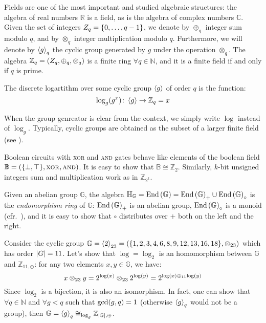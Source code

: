 Fields are one of the most important and studied algebraic structures: the algebra of real numbers 
\(\mathbb{R}\) is a field, as is the algebra of complex numbers \(\mathbb{C}\).
Given the set of integers \(Z_q = \left\{0, \dots, q-1\right\}\), we denote by \(\oplus_q\) integer sum 
modulo \(q\), and by \(\otimes_q\) integer multiplication modulo \(q\).
Furthermore, we will denote by \(\left\langle g\right\rangle_q\) the cyclic group generated by \(g\) under 
the operation \(\otimes_q\).
The algebra \(\mathbb{Z}_q = \left(Z_q, \oplus_q, \otimes_q\right)\) is a finite ring 
\(\forall q \in \mathbb{N}\), and it is a finite field if and only if \(q\) is prime.
\begin{definition}
  The discrete logartithm over some cyclic group \(\left\langle g\right\rangle\) of order \(q\) is the function:
  \[\call{\log_g}{g^x}\colon \gengroup{g} \to \mathbb{Z}_q = x\]
\end{definition}

When the group genreator is clear from the context, we simply write \(\log \) instead of \(\log_g\).
Typically, cyclic groups are obtained as the subset of a larger finite field 
(see ). 
\begin{example}
  Boolean circuits with \textsc{xor} and \textsc{and} gates behave like elements of the boolean 
  field \(\mathbb{B} = \Tuple{\Set{\bot, \top}, \bitxor, \bitand} \).
  It is easy to show that \(\mathbb{B} \cong \mathbb{Z}_2\).
  Similarly, \(k\)-bit unsigned integers sum and multiplication work as in \(\mathbb{Z}_{2^k}\).
\end{example}

\begin{example}
  Given an abelian group \(\mathbb{G}\), the algebra \(\mathbb{H}_{\mathbb{G}} = 
  \mathrm{End}\left(\mathbb{G}\right) = \mathrm{End}\left(\mathbb{G}\right)_{+} \cup \mathrm{End}\left(\mathbb{G}\right)_{\circ}\) 
  is the \emph{endomorphism ring} of \(\mathbb{G}\): \(\mathrm{End}\left(\mathbb{G}\right)_{+}\) is an abelian 
  group, \(\mathrm{End}\left(\mathbb{G}\right)_{\circ}\) is a monoid 
  (cfr.\ ), and it is easy to show that \(\circ \)
  distributes over \(+\) both on the left and the right.
\end{example}

\begin{example}\label{ex:cyclic_group}
  Consider the cyclic group 
  \(\mathbb{G} = \gengroup{2}_{23} = \Tuple{\Set{1, 2, 3, 4, 6, 8, 9, 12, 13, 16, 18}, \otimes_{23}}\)
  which has order \(\left\lvert G\right\rvert = 11\).
  Let's show that \(\log = \log_2\) is an homomorphism between \(\mathbb{G}\) and 
  \(\mathbb{Z}_{11,\oplus}\): for any two elements \(x, y \in \mathbb{G}\), 
  we have:
  \[
    x \otimes_{23} y = 2^{\log\left(x\right)} \otimes_{23} 2^{\log\left(y\right)} = 
    2^{\log\left(x\right) \oplus_{11} \log\left(y\right)}
  \]
  Since \(\log_2\) is a bijection, it is also an isomorphism.
  In fact, one can show that \(\forall q \in \mathbb{N}\) and \(\forall g < q\) such 
  that \(\call{\gcd}{g, q} = 1\) (otherwise \(\left\langle g\right\rangle_{q}\) would not be a group), then
  \(\mathbb{G} = \left\langle g\right\rangle_{q} \cong_{\log_g} \mathbb{Z}_{\left\lvert\mathbb{G}\right\rvert,\oplus}\).
\end{example}

